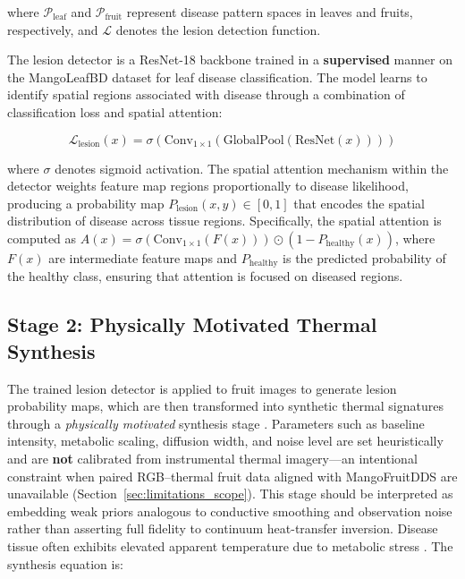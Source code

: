 \documentclass[utf8]{FrontiersinHarvard} %
\begin{document}
where $\mathcal{P}_{\text{leaf}}$ and $\mathcal{P}_{\text{fruit}}$ represent disease pattern spaces in leaves and fruits, respectively, and $\mathcal{L}$ denotes the lesion detection function.

The lesion detector is a ResNet-18 \cite{he2016} backbone trained in a \textbf{supervised} manner on the MangoLeafBD dataset for leaf disease classification. The model learns to identify spatial regions associated with disease through a combination of classification loss and spatial attention:

\begin{equation}
    \mathcal{L}_{\text{lesion}}(x) = \sigma(\text{Conv}_{1\times 1}(\text{GlobalPool}(\text{ResNet}(x))))
    \label{eq:lesion_detector}
\end{equation}

where $\sigma$ denotes sigmoid activation. The spatial attention mechanism within the detector weights feature map regions proportionally to disease likelihood, producing a probability map $P_{\text{lesion}}(x, y) \in [0, 1]$ that encodes the spatial distribution of disease across tissue regions. Specifically, the spatial attention is computed as $A(x) = \sigma(\text{Conv}_{1 \times 1}(F(x))) \odot (1 - P_{\text{healthy}}(x))$, where $F(x)$ are intermediate feature maps and $P_{\text{healthy}}$ is the predicted probability of the healthy class, ensuring that attention is focused on diseased regions.

\subsection{Stage 2: Physically Motivated Thermal Synthesis}
The trained lesion detector is applied to fruit images to generate lesion probability maps, which are then transformed into synthetic thermal signatures through a \emph{physically motivated} synthesis stage \cite{raissi2019,karniadakis2021}. Parameters such as baseline intensity, metabolic scaling, diffusion width, and noise level are set heuristically and are \textbf{not} calibrated from instrumental thermal imagery---an intentional constraint when paired RGB--thermal fruit data aligned with MangoFruitDDS are unavailable (Section~\ref{sec:limitations_scope}). This stage should be interpreted as embedding weak priors analogous to conductive smoothing and observation noise rather than asserting full fidelity to continuum heat-transfer inversion. Disease tissue often exhibits elevated apparent temperature due to metabolic stress \cite{mahlein2016,pineda2021}. The synthesis equation is:
\end{document}
